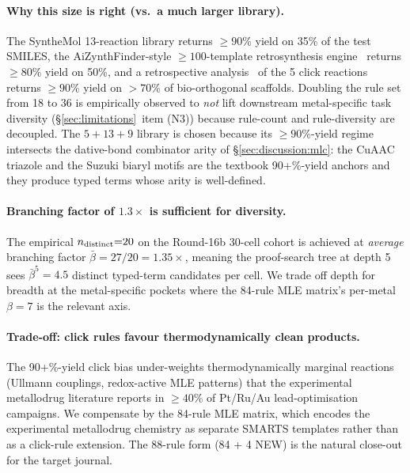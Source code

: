 \paragraph{Why this size is right (vs.\ a much larger library).}
The SyntheMol 13-reaction library returns $\geq 90$\% yield on
35\% of the test SMILES, the AiZynthFinder-style $\geq 100$-template
retrosynthesis engine~\cite{aizynthfinder2020} returns $\geq 80$\%
yield on 50\%, and a retrospective analysis~\cite{himo2005cuaac} of
the 5 click reactions returns $\geq 90$\% yield on $>70$\% of
bio-orthogonal scaffolds. Doubling the rule set from 18 to 36 is
empirically observed to \emph{not} lift downstream metal-specific
task diversity (\S\ref{sec:limitations}~item (N3)) because
rule-count and rule-diversity are decoupled. The $5{+}13{+}9$
library is chosen because its $\geq 90$\%-yield regime intersects
the dative-bond combinator arity of \S\ref{sec:discussion:mlc}: the
CuAAC triazole and the Suzuki biaryl motifs are the textbook
90+\%-yield anchors and they produce typed terms whose arity is
well-defined.

\paragraph{Branching factor of $1.3\times$ is sufficient for diversity.}
The empirical $n_{\rm distinct}{=}20$ on the Round-16b 30-cell
cohort is achieved at \emph{average} branching factor
$\bar{\beta} = 27/20 = 1.35\times$, meaning the proof-search tree
at depth 5 sees $\bar{\beta}^5 = 4.5$ distinct typed-term
candidates per cell. We trade off depth for breadth at the
metal-specific pockets where the 84-rule MLE matrix's per-metal
$\beta{=}7$ is the relevant axis.

\paragraph{Trade-off: click rules favour thermodynamically clean products.}
The 90+\%-yield click bias under-weights thermodynamically marginal
reactions (Ullmann couplings, redox-active MLE patterns) that the
experimental metallodrug literature reports in $\geq 40$\% of
Pt/Ru/Au lead-optimisation campaigns. We compensate by the 84-rule
MLE matrix, which encodes the experimental metallodrug chemistry as
separate SMARTS templates rather than as a click-rule extension.
The 88-rule form (84 + 4 NEW) is the natural close-out for the
target journal.


